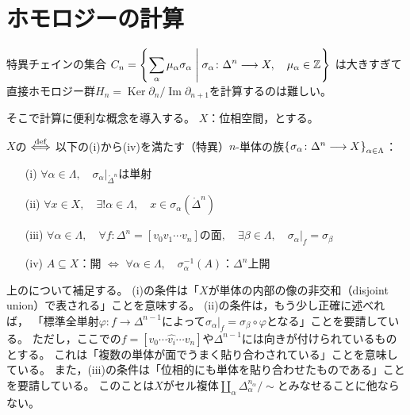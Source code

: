 \documentclass[uplatex]{jsarticle}
\renewcommand{\restriction}[2]{\left. #1 \right|_{#2}}
\DeclareMathOperator{\Image}{Im}
\DeclareMathOperator{\Kernel}{Ker}
\begin{document}
\fi

\section{ホモロジーの計算}


特異チェインの集合
${\displaystyle C_{n} = \Set{\hspace{-1.8pt}  \sum_{\alpha} \mu_{\alpha} \sigma_{\alpha} | \sigma_{\alpha} \colon \Delta^{n} \longrightarrow X, \quad \mu_{\alpha} \in \mathbb{Z} \hspace{-1.8pt}}}$
は大きすぎて直接ホモロジー群$H_{n} = \Kernel \partial_{n} / \Image \partial_{n+1}$を計算するのは難しい。

そこで計算に便利な概念を導入する。
$X$：位相空間，とする。

\begin{teigi}
	\label{homcalc.complex}
	$X$の $\overset{\mathrm{def}}{\Longleftrightarrow}$ 以下の(i)から(iv)を満たす（特異）$n$-単体の族$\Set{\hspace{-1.8pt} \sigma_{\alpha} \colon \Delta^{n} \longrightarrow X \hspace{-1.8pt}}_{\alpha \in \Lambda}$：
	\begin{enumerate}
		\vspace{-0.5\baselineskip}
		\item[(i)] $\forall \alpha \in \Lambda, \quad \restriction{\sigma_{\alpha}}{\mathring{\Delta}^{n}}$は単射
		\item[(ii)] $\forall x \in X, \quad \exists! \alpha \in \Lambda, \quad x \in \sigma_{\alpha} (\mathring{\Delta}^{n})$
		\item[(iii)] $\forall \alpha \in \Lambda, \quad \forall f : \Delta^{n} = [v_{0}v_{1}\cdots v_{n}]$の面$, \quad \exists \beta \in \Lambda, \quad \restriction{\sigma_{\alpha}}{f} = \sigma_{\beta}$
		\item[(iv)] $A \subseteq X$：開 $\Longleftrightarrow$ $\forall \alpha \in \Lambda, \quad \sigma_{\alpha}^{-1} (A)$：$\Delta^{n}$上開
	\end{enumerate}
\end{teigi}

上のについて補足する。
(i)の条件は「$X$が単体の内部の像の非交和（disjoint union）で表される」ことを意味する。
(ii)の条件は，もう少し正確に述べれば，
「標準全単射$\varphi \colon f \longrightarrow \Delta^{n-1}$によって$\restriction{\sigma_{\alpha}}{f} = \sigma_{\beta} \circ \varphi$となる」ことを要請している。
ただし，ここでの$f = [v_{0} \cdots \hat{v_{i}} \cdots v_{n}]$や$\Delta^{n-1}$には向きが付けられているものとする。
これは「複数の単体が面でうまく貼り合わされている」ことを意味している。
また，(iii)の条件は「位相的にも単体を貼り合わせたものである」ことを要請している。
このことは$X$がセル複体${\displaystyle \coprod_{\alpha} \Delta_{\alpha}^{n_{\alpha}} / \sim}$とみなせることに他ならない。
\end{document}
